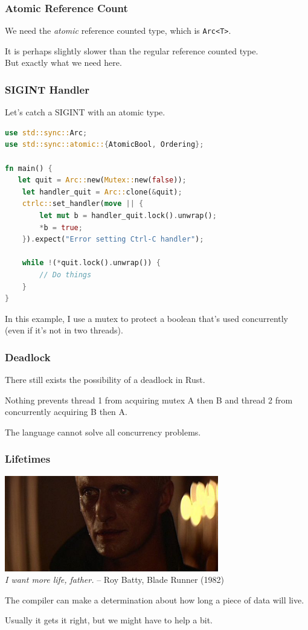 \begin{frame}
\frametitle{Atomic Reference Count}

We need the \textit{atomic} reference counted type, which is \texttt{Arc<T>}. 

It is perhaps slightly slower than the regular reference counted type.\\
\quad But exactly what we need here.

\end{frame}


\begin{frame}[fragile]
\frametitle{SIGINT Handler}

Let's catch a SIGINT with an atomic type.

\begin{lstlisting}[language=Rust]
use std::sync::Arc;
use std::sync::atomic::{AtomicBool, Ordering};

fn main() {
   let quit = Arc::new(Mutex::new(false));
    let handler_quit = Arc::clone(&quit);
    ctrlc::set_handler(move || {
        let mut b = handler_quit.lock().unwrap();
        *b = true;
    }).expect("Error setting Ctrl-C handler");
 
    while !(*quit.lock().unwrap()) {
    	// Do things
    }
}
\end{lstlisting}

In this example, I use a mutex to protect a boolean that's used concurrently (even if it's not in two threads).

\end{frame}

\begin{frame}
\frametitle{Deadlock}

There still exists the possibility of a deadlock in Rust.

Nothing prevents thread 1 from acquiring mutex A then B and thread 2 from concurrently acquiring B then A. 

The language cannot solve all concurrency problems.

\end{frame}


\begin{frame}
\frametitle{Lifetimes}
\begin{center}
	\includegraphics[width=0.7\textwidth]{images/roy-batty.jpg}\\
	\hfill \textit{I want more life, father.} -- Roy Batty, Blade Runner (1982)
\end{center}

The compiler can make a determination about how long a piece of data will live.

Usually it gets it right, but we might have to help a bit.

\end{frame}


